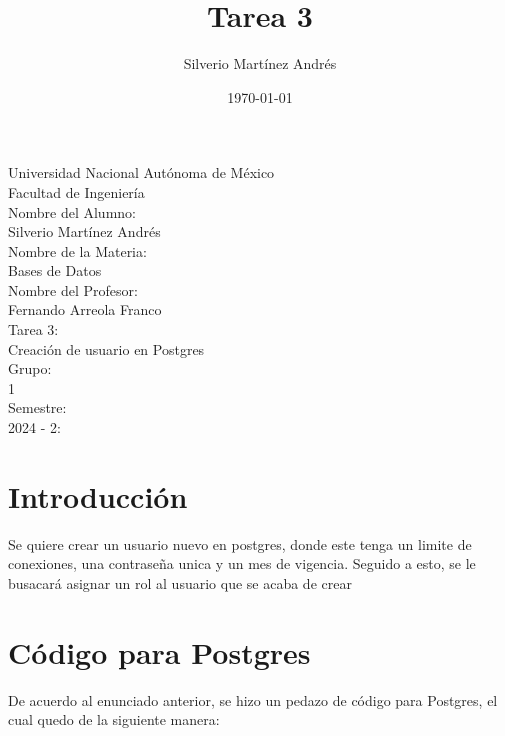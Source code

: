 \documentclass{article}
\begin{document}
	
	\begin{titlepage}
		\centering
		\vspace*{1cm}
		\Large Universidad Nacional Autónoma de México\\
		\Large Facultad de Ingeniería\\
		\vspace*{0.5cm}
		\large Nombre del Alumno:\\
		\large Silverio Martínez Andrés \\
		\vspace*{0.5cm}
		\large Nombre de la Materia:\\
		\large Bases de Datos\\
		\vspace*{0.5cm}
		\large Nombre del Profesor:\\
		\large Fernando Arreola Franco \\
		\vspace*{0.5cm}
		\large Tarea 3:\\
		\large Creación de usuario en Postgres \\
		\vspace*{0.5cm}
		\large Grupo:\\
		\large 1 \\
		\vspace*{0.5cm}
		\large Semestre:\\
		\large 2024 - 2:\\
		\vspace*{0.5cm}

	\end{titlepage}
	
	\title{Tarea 3}
	\author{Silverio Martínez Andrés}
	\date{\today}
	
	\maketitle
	
	\section{Introducción}
Se quiere crear un usuario nuevo en postgres, donde este tenga un limite de conexiones, una contraseña unica y un mes de vigencia. Seguido a esto, se le busacará asignar un rol al usuario que se acaba de crear

\section{Código para Postgres}
De acuerdo al enunciado anterior, se hizo un pedazo de código para Postgres, el cual quedo de la siguiente manera:
\end{document}
